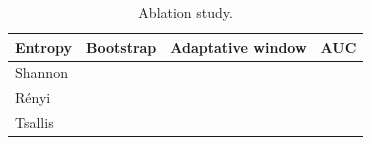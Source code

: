 \documentclass{article}
\begin{document}
	
	
\begin{table}
	\caption{Ablation study.}
	\label{tab:Ablation}
	\begin{tabular}{lccr}
		\toprule
		\multicolumn{1}{c}{\textbf{Entropy}} & \multicolumn{1}{c}{\textbf{Bootstrap}} & \multicolumn{1}{c}{\textbf{Adaptative window}} &
		\multicolumn{1}{c}{\textbf{AUC}} \\
		\midrule
		\multirow{4}{*}{Shannon} & & & \\
		 & \checkmark & & \\
		 & & \checkmark & \\
		 & \checkmark & \checkmark & \\
		 \midrule
		 \multirow{4}{*}{Rényi} & & & \\
		 & \checkmark & & \\
		 & & \checkmark & \\
		 & \checkmark & \checkmark & \\
		 \midrule
		 \multirow{4}{*}{Tsallis} & & & \\
		 & \checkmark & & \\
		 & & \checkmark & \\
		 & \checkmark & \checkmark & \\
		\bottomrule
	\end{tabular}
\end{table}
	
	
\end{document}
